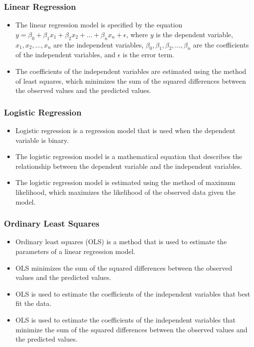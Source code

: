 \documentclass[serif, 9pt, aspectratio=32]{beamer}
\begin{document}
\begin{frame}
    \frametitle{Linear Regression}
    \begin{itemize}
        \setlength{\itemsep}{2em}
        \item The linear regression model is specified by the equation $y = \beta_0 + \beta_1 x_1 + \beta_2 x_2 + \ldots + \beta_n x_n + \epsilon$, where $y$ is the dependent variable, $x_1, x_2, \ldots, x_n$ are the independent variables, $\beta_0, \beta_1, \beta_2, \ldots, \beta_n$ are the coefficients of the independent variables, and $\epsilon$ is the error term.
        \item The coefficients of the independent variables are estimated using the method of least squares, which minimizes the sum of the squared differences between the observed values and the predicted values.
    \end{itemize}
\end{frame}

\begin{frame}
    \frametitle{Logistic Regression}
    \begin{itemize}
        \setlength{\itemsep}{2em}
        \item Logistic regression is a regression model that is used when the dependent variable is binary.
        \item The logistic regression model is a mathematical equation that describes the relationship between the dependent variable and the independent variables.
        \item The logistic regression model is estimated using the method of maximum likelihood, which maximizes the likelihood of the observed data given the model.
    \end{itemize}
\end{frame}

\begin{frame}
    \frametitle{Ordinary Least Squares}
    \begin{itemize}
        \setlength{\itemsep}{2em}
        \item Ordinary least squares (OLS) is a method that is used to estimate the parameters of a linear regression model.
        \item OLS minimizes the sum of the squared differences between the observed values and the predicted values.
        \item OLS is used to estimate the coefficients of the independent variables that best fit the data.
        \item OLS is used to estimate the coefficients of the independent variables that minimize the sum of the squared differences between the observed values and the predicted values.
    \end{itemize}
\end{frame}
\end{document}
